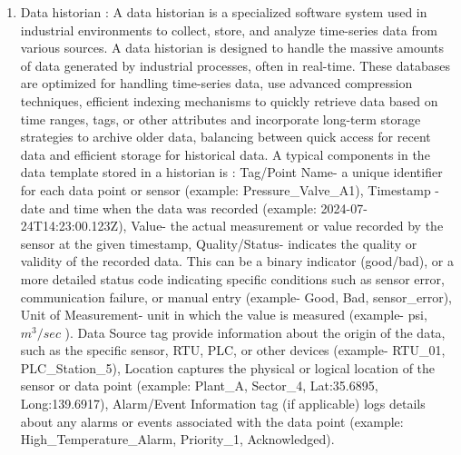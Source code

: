 \begin{enumerate}
   
    \item Data historian : A data historian is a specialized software system used in industrial environments to collect, store, and analyze time-series data from various sources. A data historian is designed to handle the massive amounts of data generated by industrial processes, often in real-time. These databases  are optimized for handling time-series data, use advanced compression techniques, efficient indexing mechanisms to quickly retrieve data based on time ranges, tags, or other attributes and incorporate long-term storage strategies to archive older data, balancing between quick access for recent data and efficient storage for historical data. A typical components in the data template stored in a historian is : Tag/Point Name- a unique identifier for each data point or sensor (example: Pressure\_Valve\_A1), Timestamp - date and time when the data was recorded (example: 2024-07-24T14:23:00.123Z), Value- the actual measurement or value recorded by the sensor at the given timestamp, Quality/Status- indicates the quality or validity of the recorded data. This can be a binary indicator (good/bad), or a more detailed status code indicating specific conditions such as sensor error, communication failure, or manual entry (example- Good, Bad, sensor\_error), Unit of Measurement- unit in which the value is measured (example- psi, $m^3/sec$ ). Data Source tag provide information about the origin of the data, such as the specific sensor, RTU, PLC, or other devices (example- RTU\_01, PLC\_Station\_5), Location captures the physical or logical location of the sensor or data point (example: Plant\_A, Sector\_4, Lat:35.6895, Long:139.6917), Alarm/Event Information  tag (if applicable) logs details about any alarms or events associated with the data point (example: High\_Temperature\_Alarm, Priority\_1, Acknowledged).

\end{enumerate}


